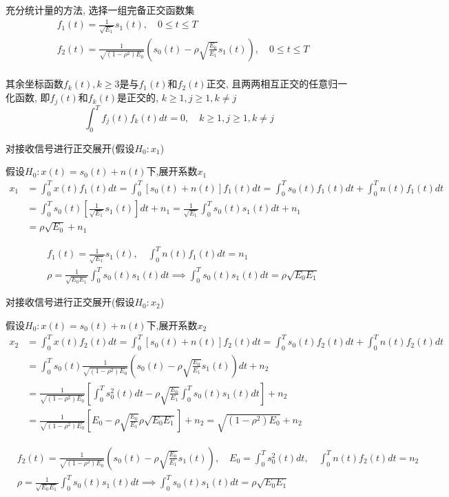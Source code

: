 \begin{frame}{充分统计量的方法, 选择一组完备正交函数集}
\begin{align*}
&f_1(t)=\frac{1}{\sqrt{E_1}}s_1(t),\quad 0\le t\le T\\
&f_2(t)=\frac{1}{\sqrt{(1-\rho^2)E_0}}\left(s_0(t)-\rho\sqrt{\frac{E_0}{E_1}}s_1(t)\right),\quad 0\le t\le T
\end{align*}
~\\
\vspace{0.2cm}
其余坐标函数$f_k(t), k\ge 3$是与$f_1(t)$和$f_2(t)$正交, 且两两相互正交的任意归一化函数, 即$f_j(t)$和$f_k(t)$是正交的, $k\ge 1, j\ge 1, k\ne j$
\[\int_{0}^{T}f_j(t)f_k(t)dt=0,\quad k\ge 1, j\ge 1, k\ne j\]
\end{frame}

\begin{frame}[shrink]{对接收信号进行正交展开(假设$H_0: x_1$)}
\begin{block}{假设$H_0:x(t)=s_0(t)+n(t)$下,展开系数$x_1$}
\begin{align*}
x_1&=\int_{0}^{T}x(t)f_1(t)dt=\int_{0}^{T}[s_0(t)+n(t)]f_1(t)dt=\int_{0}^{T}s_0(t)f_1(t)dt+\int_{0}^{T}n(t)f_1(t)dt\\
&=\int_{0}^{T}s_0(t)[\frac{1}{\sqrt{E_1}}s_1(t)]dt+n_1=\frac{1}{\sqrt{E_1}}\int_{0}^{T}s_0(t)s_1(t)dt+n_1\\
&=\rho\sqrt{E_0}+n_1
\end{align*}
\end{block}
\begin{align*}
&f_1(t)=\frac{1}{\sqrt{E_1}}s_1(t),\quad \int_{0}^{T}n(t)f_1(t)dt=n_1\\
&\rho=\frac{1}{\sqrt{E_0E_1}}\int_{0}^{T}s_0(t)s_1(t)dt\implies \int_{0}^{T}s_0(t)s_1(t)dt=\rho\sqrt{E_0E_1}
\end{align*}
\end{frame}

\begin{frame}[shrink]{对接收信号进行正交展开(假设$H_0:x_2$)}
\begin{block}{假设$H_0:x(t)=s_0(t)+n(t)$下,展开系数$x_2$}
	\begin{align*}
	x_2&=\int_{0}^{T}x(t)f_2(t)dt=\int_{0}^{T}[s_0(t)+n(t)]f_2(t)dt=\int_{0}^{T}s_0(t)f_2(t)dt+\int_{0}^{T}n(t)f_2(t)dt\\
	&=\int_{0}^{T}s_0(t)\frac{1}{\sqrt{(1-\rho^2)E_0}}\left(s_0(t)-\rho\sqrt{\frac{E_0}{E_1}}s_1(t)\right)dt+n_2\\
	&=\frac{1}{\sqrt{(1-\rho^2)E_0}}\left[\int_{0}^{T}s_0^2(t)dt-\rho\sqrt{\frac{E_0}{E_1}}\int_{0}^{T}s_0(t)s_1(t)dt\right]+n_2\\
	&=\frac{1}{\sqrt{(1-\rho^2)E_0}}\left[E_0-\rho\sqrt{\frac{E_0}{E_1}}\rho\sqrt{E_0E_1}\right]+n_2=\sqrt{(1-\rho^2)E_0}+n_2
	\end{align*}
\end{block}
\begin{align*}
&f_2(t)=\frac{1}{\sqrt{(1-\rho^2)E_0}}\left(s_0(t)-\rho\sqrt{\frac{E_0}{E_1}}s_1(t)\right),\quad E_0=\int_{0}^{T}s_0^2(t)dt,\quad \int_{0}^{T}n(t)f_2(t)dt=n_2\\
&\rho=\frac{1}{\sqrt{E_0E_1}}\int_{0}^{T}s_0(t)s_1(t)dt\implies \int_{0}^{T}s_0(t)s_1(t)dt=\rho\sqrt{E_0E_1}
\end{align*}
\end{frame}

